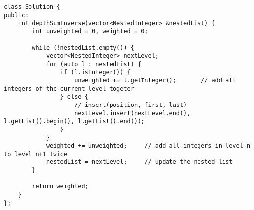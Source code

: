 \begin{lstlisting}
class Solution {
public:
    int depthSumInverse(vector<NestedInteger> &nestedList) {
        int unweighted = 0, weighted = 0;
        
        while (!nestedList.empty()) {
            vector<NestedInteger> nextLevel;
            for (auto l : nestedList) {
                if (l.isInteger()) {
                    unweighted += l.getInteger();       // add all integers of the current level togeter
                } else {
                    // insert(position, first, last)
                    nextLevel.insert(nextLevel.end(), l.getList().begin(), l.getList().end());
                }
            }
            weighted += unweighted;     // add all integers in level n to level n+1 twice
            nestedList = nextLevel;     // update the nested list
        }
        
        return weighted;
    }
};
\end{lstlisting}

